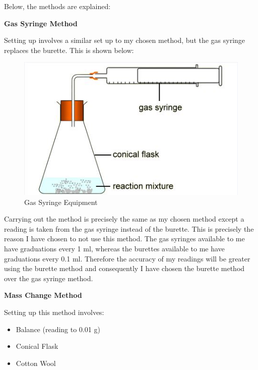 Below, the methods are explained:

\textbf{Gas Syringe Method}



Setting up involves a similar set up to my chosen method, but the gas syringe replaces the burette. This is shown below:
\begin{figure}[H]
    \includegraphics[width=\textwidth]{./Planning/Images/GasSyringe.jpg}
    \caption{Gas Syringe Equipment} \label{fig:Gas Syringe}
\end{figure}

Carrying out the method is precisely the same as my chosen method except a reading is taken from the gas syringe instead of the burette. This is precisely the reason I have chosen to not use this method. The gas syringes available to me have graduations every 1 ml, whereas the burettes available to me have graduations every 0.1 ml. Therefore the accuracy of my readings will be greater using the burette method and consequently I have chosen the burette method over the gas syringe method. 

\textbf{Mass Change Method}

Setting up this method involves:
\begin{itemize}
\item Balance (reading to 0.01 g)
\item Conical Flask
\item Cotton Wool
\end{itemize}

